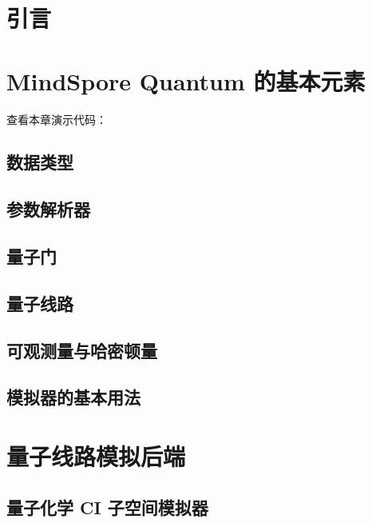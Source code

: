 \documentclass[pra,twocolumn,superscriptaddress,floatfix,nofootinbib,amsmath,amssymb]{revtex4-1}
\numberwithin{equation}{section}
\numberwithin{figure}{section}
\numberwithin{table}{section}
\begin{document}
\section{引言}



\section{MindSpore Quantum 的基本元素}
\label{sec:elements}

查看本章演示代码： \ 

\subsection{数据类型}


\subsection{参数解析器}


\subsection{量子门}


\subsection{量子线路}


\subsection{可观测量与哈密顿量}


\subsection{模拟器的基本用法}
\label{sec:sim_basic_usage}



\section{量子线路模拟后端}
\label{sec:backend}



\subsection{量子化学 CI 子空间模拟器}
\label{sec:mqchem}

\end{document}
